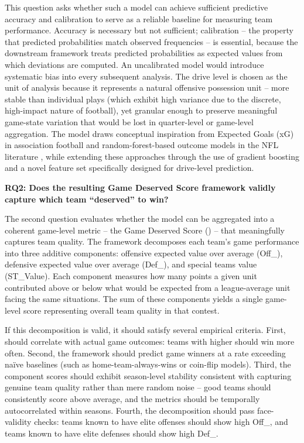 This question asks whether such a model can achieve sufficient predictive accuracy and calibration to serve as a reliable baseline for measuring team performance. Accuracy is necessary but not sufficient; calibration  -- the property that predicted probabilities match observed frequencies  -- is essential, because the downstream \gds{} framework treats predicted probabilities as expected values from which deviations are computed. An uncalibrated model would introduce systematic bias into every subsequent analysis. The drive level is chosen as the unit of analysis because it represents a natural offensive possession unit  -- more stable than individual plays (which exhibit high variance due to the discrete, high-impact nature of football), yet granular enough to preserve meaningful game-state variation that would be lost in quarter-level or game-level aggregation. The model draws conceptual inspiration from Expected Goals (xG) in association football \parencite{rathke2017expectedgoals} and random-forest-based outcome models in the NFL literature \parencite{lock2014randomforests}, while extending these approaches through the use of gradient boosting and a novel feature set specifically designed for drive-level prediction.

\textbf{RQ2: Does the resulting Game Deserved Score framework validly capture which team ``deserved'' to win?}

The second question evaluates whether the \xscore{} model can be aggregated into a coherent game-level metric  -- the Game Deserved Score (\gds{})  -- that meaningfully captures team quality. The \gds{} framework decomposes each team's game performance into three additive components: offensive expected value over average (Off\_\xvoa{}), defensive expected value over average (Def\_\xvoa{}), and special teams value (ST\_Value). Each component measures how many points a given unit contributed above or below what would be expected from a league-average unit facing the same situations. The sum of these components yields a single game-level score representing overall team quality in that contest.

If this decomposition is valid, it should satisfy several empirical criteria. First, \gds{} should correlate with actual game outcomes: teams with higher \gds{} should win more often. Second, the framework should predict game winners at a rate exceeding na\"{i}ve baselines (such as home-team-always-wins or coin-flip models). Third, the component scores should exhibit season-level stability consistent with capturing genuine team quality rather than mere random noise  -- good teams should consistently score above average, and the metrics should be temporally autocorrelated within seasons. Fourth, the decomposition should pass face-validity checks: teams known to have elite offenses should show high Off\_\xvoa{}, and teams known to have elite defenses should show high Def\_\xvoa{}.

